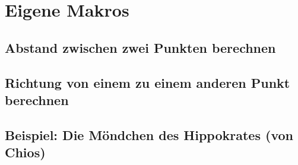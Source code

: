 \documentclass
[
  draft      = true,
  fontsize   = 11pt,
  parskip    = half-,
  BCOR       = 0pt,
  DIV        = 10,
  dvipsnames %
]
{scrartcl}
\newcommand{\shapedst}[3]
{%
  \ifthenelse{\isundefined{#3}}{\def#3{\relax}}{\relax}%
  \pgfextractx{\dimen0}{\pgfpointdiff{\pgfpointanchor{#1}{center}}%
                                     {\pgfpointanchor{#2}{center}}}%
  \pgfextracty{\dimen1}{\pgfpointdiff{\pgfpointanchor{#1}{center}}%
                                     {\pgfpointanchor{#2}{center}}}%
  \pgfmathsetmacro{#3}{veclen(\the\dimen0,\the\dimen1)}%
  \edef#3{#3pt}%
}
\newcommand{\shapedir}[3]
{%
  \ifthenelse{\isundefined{#3}}{\def#3{\relax}}{\relax}%
  \pgfextractx{\dimen0}{\pgfpointdiff{\pgfpointanchor{#1}{center}}%
                                     {\pgfpointanchor{#2}{center}}}%
  \pgfextracty{\dimen1}{\pgfpointdiff{\pgfpointanchor{#1}{center}}%
                                     {\pgfpointanchor{#2}{center}}}%
  \pgfmathsetmacro{#3}{atan2(\the\dimen1,\the\dimen0)}%
}
\begin{document}
\section{Eigene Makros}

\subsection{Abstand zwischen zwei Punkten berechnen}
\begin{footnotesize}

\end{footnotesize}

\subsection{Richtung von einem zu einem anderen Punkt berechnen}
\begin{footnotesize}

\end{footnotesize}

\subsection{Beispiel: Die Möndchen des Hippokrates (von Chios)}
\begin{center}
  \newcommand{\moendchen}[2]
  {
    \begin{scope}
      \coordinate (A) at (-#1, 0);
      \coordinate (B) at ( #1, 0);
      \coordinate (C) at ($(0, 0)!#1!#2:(B)$);
      \shapedir{B}{C}{\dirBC}
      \shapedst{B}{C}{\dstBC}
      \shapedir{C}{A}{\dirCA}
      \shapedst{C}{A}{\dstCA}
      \filldraw[fill=OliveGreen] (A) -- (B) -- (C) -- cycle;
      \filldraw[fill=LimeGreen]
               (B) arc[start angle=0, end angle=#2, radius=#1]
                   arc[start angle=\dirBC, delta angle=-180, radius=\dstBC/2];
      \filldraw[fill=LimeGreen]
               (C) arc[start angle=#2, end angle=180, radius=#1]
                   arc[start angle=\dirCA, delta angle=-180, radius=\dstCA/2];
      \fill (A) circle[radius=1pt];
      \fill (B) circle[radius=1pt];
      \fill (C) circle[radius=1pt];
    \end{scope}
  }
\end{center}
\begin{footnotesize}

\end{footnotesize}
\end{document}
